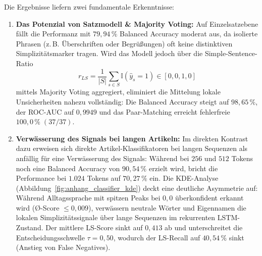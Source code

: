 Die Ergebnisse liefern zwei fundamentale Erkenntnisse:
\begin{enumerate}
    \item \textbf{Das Potenzial von Satzmodell \& Majority Voting:} Auf Einzelsatzebene fällt die Performanz mit $79{,}94\,\%$ Balanced Accuracy moderat aus, da isolierte Phrasen (z.\,B. Überschriften oder Begrüßungen) oft keine distinktiven Simplizitätsmarker tragen. Wird das Modell jedoch über die Simple-Sentence-Ratio
    \begin{equation}
        r_{LS} = \frac{1}{|S|} \sum_{s \in S} \mathbb{I}(\hat{y}_s = 1) \in [0{,}0, 1{,}0]
    \end{equation}
    mittels Majority Voting aggregiert, eliminiert die Mittelung lokale Unsicherheiten nahezu vollständig: Die Balanced Accuracy steigt auf $98{,}65\,\%$, der ROC-AUC auf $0{,}9949$ und das Paar-Matching erreicht fehlerfreie $100{,}0\,\%\; (37/37)$.
    
    \item \textbf{Verwässerung des Signals bei langen Artikeln:} Im direkten Kontrast dazu erweisen sich direkte Artikel-Klassifikatoren bei langen Sequenzen als anfällig für eine Verwässerung des Signals: Während bei $256$ und $512$ Tokens noch eine Balanced Accuracy von $90{,}54\,\%$ erzielt wird, bricht die Performance bei $1.024$ Tokens auf $70{,}27\,\%$ ein. Die KDE-Analyse (Abbildung~\ref{fig:anhang_classifier_kde}) deckt eine deutliche Asymmetrie auf: Während Alltagssprache mit spitzen Peaks bei $0{,}0$ überkonfident erkannt wird (\O{}-Score $\le 0{,}009$), verwässern neutrale Wörter und Eigennamen die lokalen Simplizitätssignale über lange Sequenzen im rekurrenten LSTM-Zustand. Der mittlere LS-Score sinkt auf $0{,}413$ ab und unterschreitet die Entscheidungsschwelle $\tau = 0{,}50$, wodurch der LS-Recall auf $40{,}54\,\%$ sinkt (Anstieg von False Negatives).
\end{enumerate}

